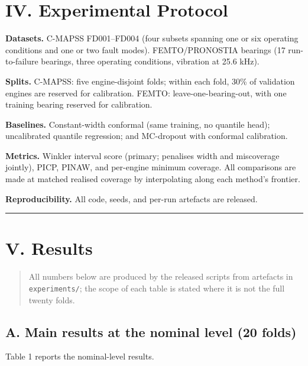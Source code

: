 ﻿\documentclass[journal]{IEEEtran}
\begin{document}
\section{IV. Experimental Protocol}\label{iv.-experimental-protocol}

\textbf{Datasets.} C-MAPSS FD001--FD004 \citep{saxena2008} (four subsets spanning one or six operating conditions and one or two fault modes). FEMTO/PRONOSTIA bearings \citep{nectoux2012} (17 run-to-failure bearings, three operating conditions, vibration at 25.6 kHz).

\textbf{Splits.} C-MAPSS: five engine-disjoint folds; within each fold, 30\% of validation engines are reserved for calibration. FEMTO: leave-one-bearing-out, with one training bearing reserved for calibration.

\textbf{Baselines.} Constant-width conformal (same training, no quantile head); uncalibrated quantile regression; and MC-dropout with conformal calibration.

\textbf{Metrics.} Winkler interval score (primary; penalises width and miscoverage jointly), PICP, PINAW, and per-engine minimum coverage. All comparisons are made at matched realised coverage by interpolating along each method's frontier.

\textbf{Reproducibility.} All code, seeds, and per-run artefacts are released.

\begin{center}\rule{0.5\linewidth}{0.5pt}\end{center}

\section{V. Results}\label{v.-results}

\begin{quote}
All numbers below are produced by the released scripts from artefacts in \texttt{experiments/}; the scope of each table is stated where it is not the full twenty folds.
\end{quote}

\subsection{A. Main results at the nominal level (20 folds)}\label{a.-main-results-at-the-nominal-level-20-folds}

Table 1 reports the nominal-level results.
\end{document}
